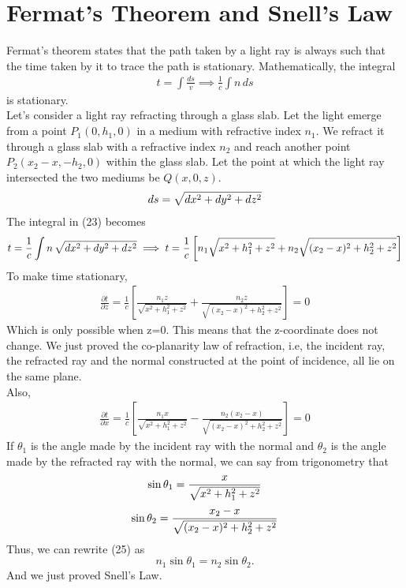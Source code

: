 \documentclass[12pt]{article}
\begin{document}
\section{Fermat's Theorem and Snell's Law}
Fermat's theorem states that the path taken by a light ray is always such that the time taken
by it to trace the path is stationary. Mathematically, the integral
\begin{align}
    t=\int \frac{ds}{v} \implies \frac{1}{c}\int n \, ds
\end{align}
is stationary. \\
Let's consider a light ray refracting through a glass slab. Let the light emerge from a point
$P_1(0,h_1,0)$ in a medium with refractive index $n_1$. We refract it through a glass slab
with a refractive index $n_2$ and reach another point $P_2(x_2-x,-h_2,0)$ within the glass slab.
Let the point at which the light ray intersected the two mediums be $Q(x,0,z)$.
\begin{align}
    ds=\sqrt{dx^2+dy^2+dz^2} \notag
\end{align}
The integral in (23) becomes 
\begin{align}
    t=\frac{1}{c} \int n \, \sqrt{dx^2+dy^2+dz^2} \implies t = \frac{1}{c}\left[n_1 \sqrt{x^2+h_1^2+z^2}+n_2 \sqrt{(x_2-x)^2+h_2^2+z^2}\right] \notag
\end{align}
To make time stationary,
\begin{align}
    \frac{\partial t}{\partial z}=\frac{1}{c}\left[\frac{n_1z}{\sqrt{x^2+h_1^2+z^2}}+\frac{n_2z}{\sqrt{(x_2-x)^2+h_2^2+z^2}}\right]=0
\end{align}
Which is only possible when z=0. This means that the z-coordinate does not change. We just proved the
co-planarity law of refraction, i.e, the incident ray, the refracted ray and the normal constructed at the point of incidence, all lie on the same plane.
\\ Also,
\begin{align}
    \frac{\partial t}{\partial x}=\frac{1}{c}\left[\frac{n_1x}{\sqrt{x^2+h_1^2+z^2}}-\frac{n_2(x_2-x)}{\sqrt{(x_2-x)^2+h_2^2+z^2}}\right]=0
\end{align}
If $\theta_1$ is the angle made by the incident ray with the normal and $\theta_2$ is the angle made by the refracted ray with the normal, we can say from trigonometry that
\begin{align}
  \sin \theta_1 = \frac{x}{\sqrt{x^2+h_1^2+z^2}} \notag
\end{align}
\begin{align}
  \sin \theta_2 = \frac{x_2-x}{\sqrt{(x_2-x)^2+h_2^2+z^2}} \notag
\end{align}
Thus, we can rewrite (25) as
\begin{equation}
    n_1 \sin \theta_1 = n_2 \sin \theta_2.
\end{equation}
And we just proved Snell's Law.
\end{document}
